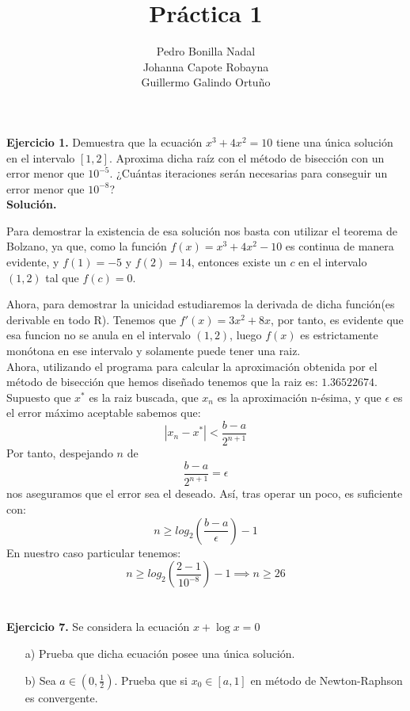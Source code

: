 \documentclass[11pt]{article}
\title{\textbf{Práctica 1}}
\author{Pedro Bonilla Nadal\\
		Johanna Capote Robayna\\
		Guillermo Galindo Ortuño}
\date{}
\begin{document}
\maketitle

\textbf{Ejercicio 1.}
Demuestra que la ecuaci\'on $x^3 + 4x^2 = 10 $ tiene una \'unica soluci\'on en el intervalo $ [1,2] $. Aproxima dicha ra\'iz con el m\'etodo de bisecci\'on con un error menor que $10^{-5}$. ¿Cu\'antas iteraciones ser\'an necesarias para conseguir un error menor que $10^{-8}$?
\\

\textbf{Solución.}

Para demostrar la existencia de esa solución nos basta con utilizar el teorema de Bolzano, ya que, como la funci\'on $f(x)=x^3 +4x^2 -10$ es continua de manera evidente, y $f(1) = -5$ y $f(2) =  14$, entonces existe un $c$ en el intervalo $(1,2)$ tal que $f(c) = 0$.

Ahora, para demostrar la unicidad estudiaremos la derivada de dicha función(es derivable en todo
 R). Tenemos que $f'(x) = 3x^2 +8x$, por tanto, es evidente que esa funcion no se anula en el intervalo $(1,2)$, luego $f(x)$ es estrictamente monótona en ese intervalo y solamente puede tener una raiz.
\\

Ahora, utilizando el programa para calcular la aproximación obtenida por el método de bisección que hemos diseñado tenemos que la raiz es: $1.36522674$.
\\

Supuesto que $x^*$ es la raiz buscada, que $x_n$ es la aproximación n-ésima, y que $\epsilon$ es el error máximo aceptable sabemos que:
$$|x_n - x^*| < \frac{b-a}{2^{n+1}}$$
Por tanto, despejando $n$ de
$$\frac{b-a}{2^{n+1}} = \epsilon$$
nos aseguramos que el error sea el deseado. Así, tras operar un poco, es suficiente con:
$$ n \geq log_2(\frac{b-a}{\epsilon})-1$$
En nuestro caso particular tenemos:
$$n \geq log_2(\frac{2-1}{10^{-8}})-1 \implies n \geq 26$$
\\ \\

\textbf{Ejercicio 7.}
Se considera la ecuaci\'on $x + \log x = 0$

\begin{itemize}
\item[a)]Prueba que dicha ecuaci\'on posee una \'unica soluci\'on.
\item[b)] Sea $a \in (0, \frac{1}{2})$. Prueba que  si $x_0 \in [a,1]$ en m\'etodo de Newton-Raphson es convergente.
\end{itemize}
\end{document}
